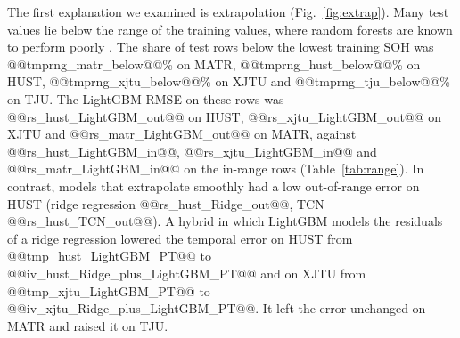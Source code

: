 \documentclass{ieeeaccess}
\begin{document}
The first explanation we examined is extrapolation (Fig.~\ref{fig:extrap}). Many test values lie below the range of the training values, where random forests are known to perform poorly \cite{zhang2019rerf}. The share of test rows below the lowest training SOH was @@tmprng_matr_below@@\% on MATR, @@tmprng_hust_below@@\% on HUST, @@tmprng_xjtu_below@@\% on XJTU and @@tmprng_tju_below@@\% on TJU. The LightGBM RMSE on these rows was @@rs_hust_LightGBM_out@@ on HUST, @@rs_xjtu_LightGBM_out@@ on XJTU and @@rs_matr_LightGBM_out@@ on MATR, against @@rs_hust_LightGBM_in@@, @@rs_xjtu_LightGBM_in@@ and @@rs_matr_LightGBM_in@@ on the in-range rows (Table~\ref{tab:range}). In contrast, models that extrapolate smoothly had a low out-of-range error on HUST (ridge regression @@rs_hust_Ridge_out@@, TCN @@rs_hust_TCN_out@@). A hybrid in which LightGBM models the residuals of a ridge regression lowered the temporal error on HUST from @@tmp_hust_LightGBM_PT@@ to @@iv_hust_Ridge_plus_LightGBM_PT@@ and on XJTU from @@tmp_xjtu_LightGBM_PT@@ to @@iv_xjtu_Ridge_plus_LightGBM_PT@@. It left the error unchanged on MATR and raised it on TJU.
\end{document}
